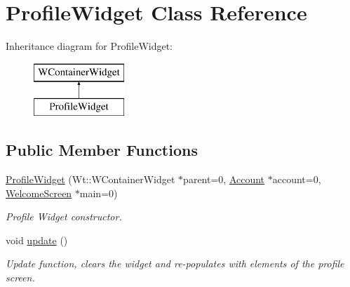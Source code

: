 \hypertarget{classProfileWidget}{}\section{Profile\+Widget Class Reference}
\label{classProfileWidget}
Inheritance diagram for Profile\+Widget\+:\begin{figure}[H]
\begin{center}
\leavevmode
\includegraphics[height=2.000000cm]{classProfileWidget}
\end{center}
\end{figure}
\subsection*{Public Member Functions}
\begin{DoxyCompactItemize}
\item 
\hyperlink{classProfileWidget_a2fcfd867268b4ca8d3d8db067ad770df}{Profile\+Widget} (Wt\+::\+W\+Container\+Widget $\ast$parent=0, \hyperlink{classAccount}{Account} $\ast$account=0, \hyperlink{classWelcomeScreen}{Welcome\+Screen} $\ast$main=0)
\begin{DoxyCompactList}\small\item\em Profile Widget constructor. \end{DoxyCompactList}\item 
void \hyperlink{classProfileWidget_a6c093ffd95dedf4814b10b53865784ca}{update} ()
\begin{DoxyCompactList}\small\item\em Update function, clears the widget and re-\/populates with elements of the profile screen. \end{DoxyCompactList}\end{DoxyCompactItemize}
